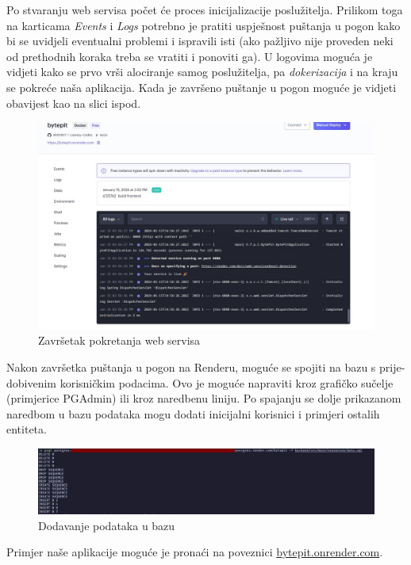 \begin{itemize}
	Po stvaranju web servisa počet će proces inicijalizacije poslužitelja. Prilikom toga na karticama \textit{Events} i \textit{Logs} potrebno je pratiti uspješnost puštanja u pogon kako bi se uvidjeli eventualni problemi i ispravili isti (ako pažljivo nije proveden neki od prethodnih koraka treba se vratiti i ponoviti ga). U logovima moguća je vidjeti kako se prvo vrši alociranje samog poslužitelja, pa \textit{dokerizacija} i na kraju se pokreće naša aplikacija. Kada je završeno puštanje u pogon moguće je vidjeti obavijest kao na slici ispod.
	\begin{figure}[H]
		\includegraphics[scale=0.3]{slike/deployment4.jpeg}
		\centering
		\caption{Završetak pokretanja web servisa}
		\label{deployment4}
	\end{figure}
\end{itemize}

Nakon završetka puštanja u pogon na Renderu, moguće se spojiti na bazu s prije-dobivenim korisničkim podacima. Ovo je moguće napraviti kroz grafičko sučelje (primjerice PGAdmin) ili kroz naredbenu liniju. Po spajanju se dolje prikazanom naredbom u bazu podataka mogu dodati inicijalni korisnici i primjeri ostalih entiteta.

\begin{figure}[H]
	\includegraphics[scale=0.25]{slike/deployment5.jpeg}
	\centering
	\caption{Dodavanje podataka u bazu}
	\label{deployment5}
\end{figure}

Primjer naše aplikacije moguće je pronaći na poveznici \href{https://bytepit.onrender.com/}{bytepit.onrender.com}. 


\eject 